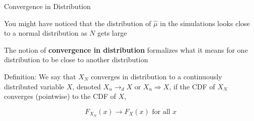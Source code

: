 \documentclass[11pt,english,handout]{beamer}
\newenvironment{wideitemize}{\itemize\addtolength{\itemsep}{10pt}}{\enditemize}
\begin{document}
\begin{frame}{Convergence in Distribution}
	
	\begin{wideitemize}

		\item
		You might have noticed that the distribution of $\hat\mu$ in the simulations looks close to a normal distribution as $N$ gets large
		
		\item
		The notion of \textbf{convergence in distribution} formalizes what it means for one distribution to be close to another distribution
		
		
		\pause
		\item
		Definition: We say that $X_N$ converges in distribution to a continuously distributed variable $X$, denoted $X_n \rightarrow_d X$ or $X_n \Rightarrow X$, if the CDF of $X_N$ converges (pointwise) to the CDF of $X$,
		
		$$F_{X_N}(x) \rightarrow F_{X}(x) \text{ for all } x$$ 
		
		
%		
	\end{wideitemize}
	
\end{frame}
\end{document}
